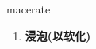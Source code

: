 
\begin{frame}
{\huge macerate}
\begin{center}
\begin{enumerate}\Large
  \item \textbf{浸泡(以软化)}
\end{enumerate}
\end{center}
\end{frame}
